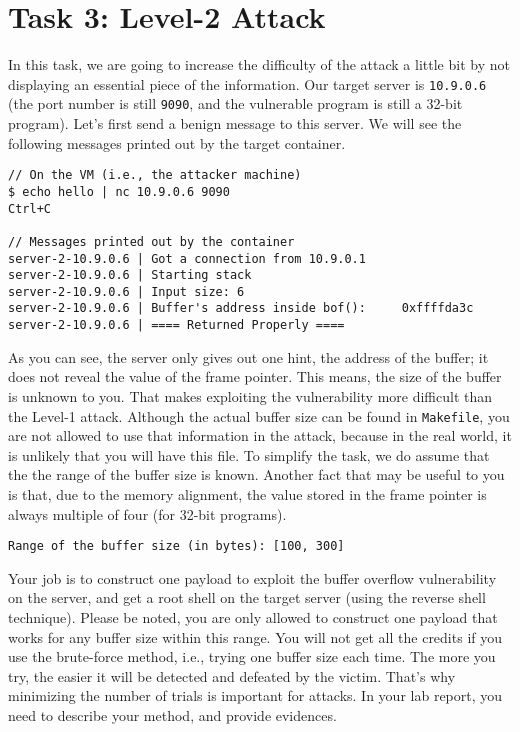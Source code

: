 \section{Task 3: Level-2 Attack} 

In this task, we are going to increase the difficulty
of the attack a little bit by not displaying an essential 
piece of the information. Our target server is 
\texttt{10.9.0.6} (the port number is still \texttt{9090}, and the 
vulnerable program is still a 32-bit program). 
Let's first send a benign message to this server. 
We will see the following messages printed out by the target container. 

\begin{lstlisting}
// On the VM (i.e., the attacker machine)
$ echo hello | nc 10.9.0.6 9090
Ctrl+C

// Messages printed out by the container
server-2-10.9.0.6 | Got a connection from 10.9.0.1
server-2-10.9.0.6 | Starting stack
server-2-10.9.0.6 | Input size: 6
server-2-10.9.0.6 | Buffer's address inside bof():     0xffffda3c
server-2-10.9.0.6 | ==== Returned Properly ====
\end{lstlisting}
 
As you can see, the server only gives out one hint, the 
address of the buffer; it does not reveal the value of the 
frame pointer. This means, the size of the buffer is unknown
to you. That makes exploiting the vulnerability more 
difficult than the Level-1 attack. 
Although the actual buffer size can be found in 
\texttt{Makefile}, you are not allowed to use that 
information in the attack, because in the real world, it is 
unlikely that you will have this file. 
To simplify the task, we do assume that the
the range of the buffer size is known.
Another fact that
may be useful to you is that, due to the memory alignment,
the value stored in the
frame pointer is always multiple of four (for 32-bit programs).


\begin{lstlisting}
Range of the buffer size (in bytes): [100, 300]
\end{lstlisting}
 

Your job is to construct one payload to exploit the buffer overflow
vulnerability on the server, and get a root shell on the target server (using
the reverse shell technique). Please be noted, you are only allowed 
to construct one payload that works for any buffer size 
within this range.  You will not get all the credits if you 
use the brute-force method, i.e., trying one buffer size
each time. The more you try, the easier it will be detected 
and defeated by the victim. That's why minimizing the number 
of trials is important for attacks. 
In your lab report, you need to describe your method, 
and provide evidences.



